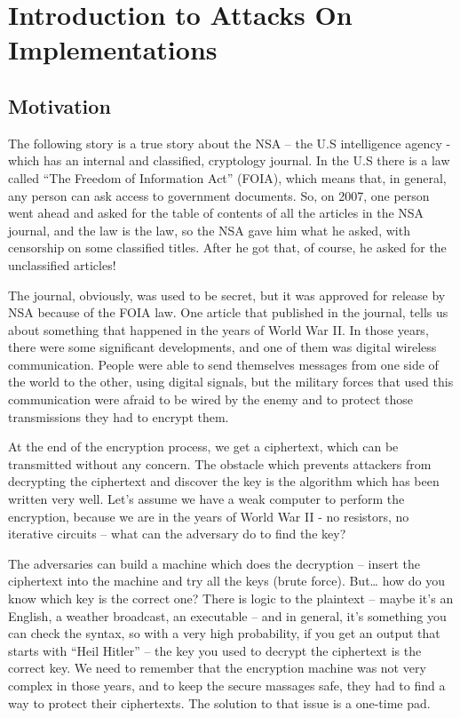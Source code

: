 \chapter{Introduction to Attacks On Implementations}
\label{chap:c1_IntroductionAOI}

\section{Motivation} %
\label{sec:Motivation}

The following story is a true story about the NSA – the U.S intelligence agency -  which has an internal and classified, cryptology journal. In the U.S there is a law called “The Freedom of Information Act” (FOIA), which means that, in general, any person can ask access to government documents. So, on 2007, one person went ahead and asked for the table of contents of all the articles in the NSA journal, and the law is the law, so the NSA gave him what he asked, with censorship on some classified titles. After he got that, of course, he asked for the unclassified articles!

The journal, obviously, was used to be secret, but it was approved for release by NSA because of the FOIA law. One article that published in the journal, tells us about something that happened in the years of World War II. In those years, there were some significant developments, and one of them was digital wireless communication. People were able to send themselves messages from one side of the world to the other, using digital signals, but the military forces that used this communication were afraid to be wired by the enemy and to protect those transmissions they had to encrypt them.    

At the end of the encryption process, we get a ciphertext, which can be transmitted without any concern. The obstacle which prevents attackers from decrypting the ciphertext and discover the key is the algorithm which has been written very well.  
Let’s assume we have a weak computer to perform the encryption, because we are in the years of World War II -  no resistors, no iterative circuits – what can the adversary do to find the key?

The adversaries can build a machine which does the decryption – insert the ciphertext into the machine and try all the keys (brute force). But… how do you know which key is the correct one? There is logic to the plaintext – maybe it’s an English, a weather broadcast, an executable – and in general, it’s something you can check the syntax, so with a very high probability, if you get an output that starts with “Heil Hitler” – the key you used to decrypt the ciphertext is the correct key. We need to remember that the encryption machine was not very complex in those years, and to keep the secure massages safe, they had to find a way to protect their ciphertexts. The solution to that issue is a one-time pad.

